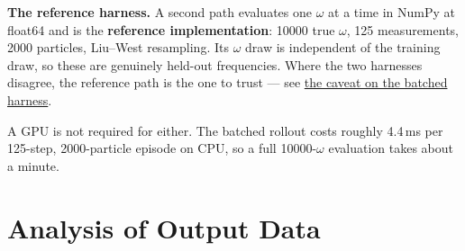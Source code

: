\documentclass[12pt,a4paper]{article}
\begin{document}
\textbf{The reference harness.} A second path evaluates one $\omega$ at a time in NumPy at float64 and is the \textbf{reference implementation}: \num{10000} true $\omega$, 125 measurements, 2000 particles, Liu--West resampling. Its $\omega$ draw is independent of the training draw, so these are genuinely held-out frequencies. Where the two harnesses disagree, the reference path is the one to trust --- see \hyperref[sec:a-caveat-on-the-earlier-baseline-table]{the caveat on the batched harness}.

A GPU is not required for either. The batched rollout costs roughly 4.4\,ms per 125-step, 2000-particle episode on CPU, so a full \num{10000}-$\omega$ evaluation takes about a minute.

\FloatBarrier
\section{Analysis of Output Data}\label{sec:analysis-of-output-data}
\end{document}
